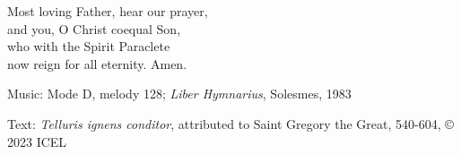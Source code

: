 \hymn



\begin{underhymnverse}
Most loving Father, hear our prayer,\\
and you, O Christ coequal Son,\\
who with the Spirit Paraclete\\
now reign for all eternity. Amen.
\end{underhymnverse}

\begin{hymnsource}
Music: Mode D, melody 128; \emph{Liber Hymnarius}, Solesmes, 1983

Text: \emph{Telluris ignens conditor}, attributed to Saint Gregory the Great, 540-604, © 2023 ICEL
\end{hymnsource}
